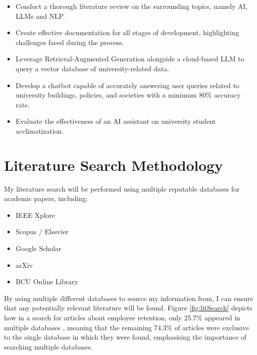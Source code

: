 \documentclass[12pt]{report}
\begin{document}
    \begin{itemize}
        \item Conduct a thorough literature review on the surrounding topics, namely AI, LLMs and NLP.
        \item Create effective documentation for all stages of development, highlighting challenges faced during the process.
        \item Leverage Retrieval-Augmented Generation alongside a cloud-based LLM to query a vector database of university-related data.
        \item Develop a chatbot capable of accurately answering user queries related to university 
        buildings, policies, and societies with a minimum 80\% accuracy rate.
        \item Evaluate the effectiveness of an AI assistant on university student acclimatization.
    \end{itemize}

    \pagebreak %

    \section{Literature Search Methodology}

    \noindent 
    My literature search will be performed using multiple reputable databases for academic papers, including:
    \begin{itemize}
        \item IEEE Xplore
        \item Scopus / Elsevier
        \item Google Scholar
        \item arXiv
        \item BCU Online Library
    \end{itemize}
    
    \noindent By using multiple different databases to source my information from, I can ensure that
    any potentially relevant literature will be found. Figure \ref{fig:litSearch} depicts 
    how in a search for articles about employee retention, only 25.7\% appeared in multiple databases
    \autocite{litSearch}, meaning that the remaining 74.3\% of articles were exclusive to the single 
    database in which they were found, emphasising the importance of searching multiple databases.  
\end{document}
